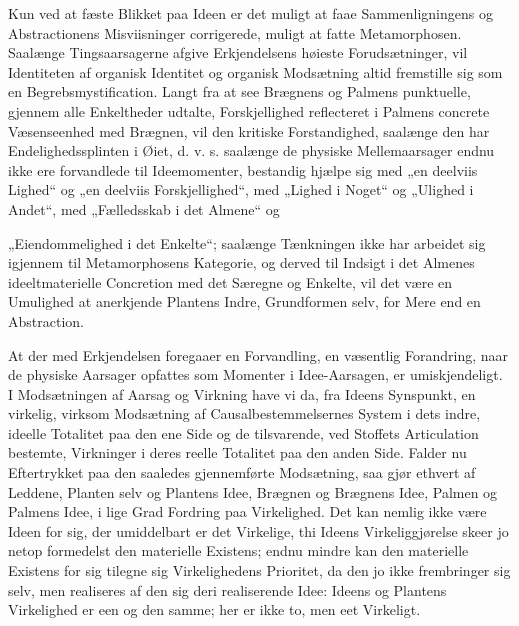 \documentclass[12pt,a4paper]{book}
\begin{document}
Kun ved at fæste Blikket paa Ideen er det muligt at faae
Sammenligningens og Abstractionens Misviisninger corrigerede, muligt at
fatte Metamorphosen. Saalænge Tingsaarsagerne afgive Erkjendelsens
høieste Forudsætninger, vil Identiteten af organisk Identitet og
organisk Modsætning altid fremstille sig som en Begrebsmystification.
Langt fra at see Brægnens og Palmens punktuelle, gjennem alle
Enkeltheder udtalte, Forskjellighed reflecteret i Palmens concrete
Væsenseenhed med Brægnen, vil den kritiske Forstandighed, saalænge den
har Endelighedssplinten i Øiet, d. v. s. saalænge de physiske
Mellemaarsager endnu ikke ere forvandlede til Ideemomenter, bestandig
hjælpe sig med „en deelviis Lighed“ og „en deelviis Forskjellighed“, med
„Lighed i Noget“ og „Ulighed i Andet“, med „Fælledsskab i det Almene“ og

„Eiendommelighed i det Enkelte“; saalænge Tænkningen ikke har arbeidet sig
igjennem til Metamorphosens Kategorie, og derved til Indsigt i det Almenes
ideeltmaterielle Concretion med det Særegne og Enkelte, vil det være en
Umulighed at anerkjende Plantens Indre, Grundformen selv, for Mere end en
Abstraction.

At der med Erkjendelsen foregaaer en Forvandling, en væsentlig Forandring,
naar de physiske Aarsager opfattes som Momenter i Idee-Aarsagen, er
umiskjendeligt. I Modsætningen af Aarsag og Virkning have vi da, fra Ideens
Synspunkt, en virkelig, virksom Modsætning af Causalbestemmelsernes System i
dets indre, ideelle Totalitet paa den ene Side og de tilsvarende, ved Stoffets
Articulation bestemte, Virkninger i deres reelle Totalitet paa den anden Side.
Falder nu Eftertrykket paa den saaledes gjennemførte Modsætning, saa gjør
ethvert af Leddene, Planten selv og Plantens Idee, Brægnen og Brægnens Idee,
Palmen og Palmens Idee, i lige Grad Fordring paa Virkelighed. Det kan nemlig
ikke være Ideen for sig, der umiddelbart er det Virkelige, thi Ideens
Virkeliggjørelse skeer jo netop formedelst den materielle Existens; endnu
mindre kan den materielle Existens for sig tilegne sig Virkelighedens
Prioritet, da den jo ikke frembringer sig selv, men realiseres af den sig deri
realiserende Idee: Ideens og Plantens Virkelighed er een og den samme; her er
ikke to, men eet Virkeligt.
\end{document}
